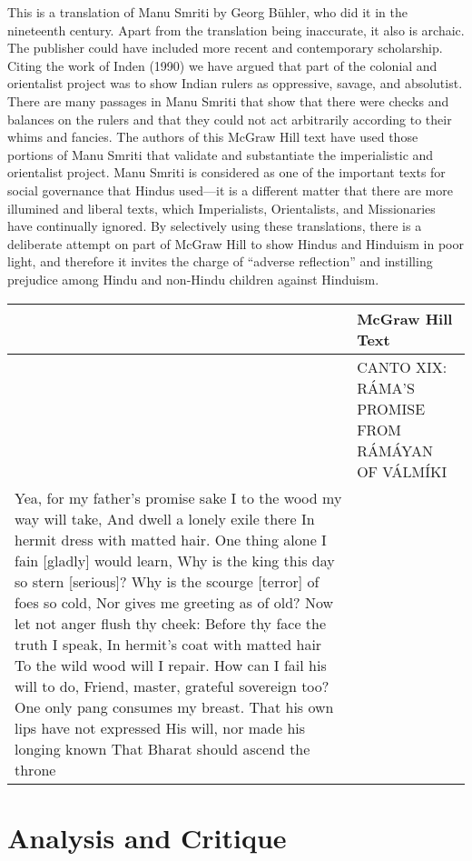 This is a translation of Manu Smriti by Georg Bühler, who did it in the nineteenth century. Apart from the translation being inaccurate, it also is archaic. The publisher could have included more recent and contemporary scholarship. Citing the work of Inden (1990) we have argued that part of the colonial and orientalist project was to show Indian rulers as oppressive, savage, and absolutist. There are many passages in Manu Smriti that show that there were checks and balances on the rulers and that they could not act arbitrarily according to their whims and fancies. The authors of this McGraw Hill text have used those portions of Manu Smriti that validate and substantiate the imperialistic and orientalist project. Manu Smriti is considered as one of the important texts for social governance that Hindus used—it is a different matter that there are more illumined and liberal texts, which Imperialists, Orientalists, and Missionaries have continually ignored. By selectively using these translations, there is a deliberate attempt on part of McGraw Hill to show Hindus and Hinduism in poor light, and therefore it invites the charge of “adverse reflection” and instilling prejudice among Hindu and non-Hindu children against Hinduism.

\begin{longtable}{|>{\raggedleft}p{1.5cm}|p{8.5cm}|}
\multicolumn{2}{|c|{\textbf{Table: 6}} 
\hline
\multicolumn{1}{|l|}{\textbf{Page #}} & \multicolumn{1}{|l|}{\textbf{McGraw Hill Text}} \tabularnewline
\hline 
281 & CANTO XIX: RÁMA’S PROMISE FROM RÁMÁYAN OF VÁLMÍKI\\ Yea, for my father’s promise sake I to the wood my way will take, And dwell a lonely exile there In hermit dress with matted hair. One thing alone I fain [gladly] would learn, Why is the king this day so stern [serious]? Why is the scourge [terror] of foes so cold, Nor gives me greeting as of old? Now let not anger flush thy cheek: Before thy face the truth I speak, In hermit’s coat with matted hair To the wild wood will I repair. How can I fail his will to do, Friend, master, grateful sovereign too? One only pang consumes my breast. That his own lips have not expressed His will, nor made his longing known That Bharat should ascend the throne\tabularnewline
\hline
\end{longtable}

\section*{Analysis and Critique} 

